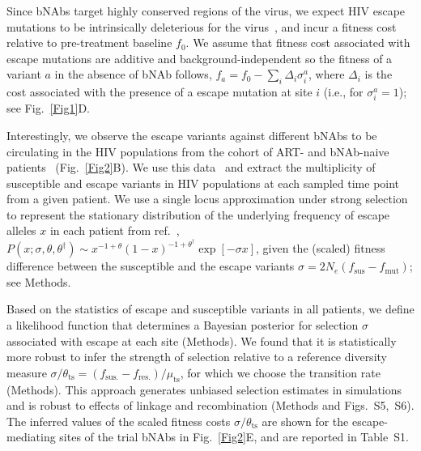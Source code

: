 \documentclass[aps,prx,noshowpacs,twocolumn,nofootinbib]{revtex4-2}
\begin{document}
  Since bNAbs target highly conserved regions of the virus, we expect HIV escape mutations to be intrinsically deleterious for the virus~\cite{Ferguson:2013kb,meijersPredictingVivoEscape2021}, and incur a fitness cost relative to pre-treatment baseline $f_0$. We assume that fitness cost associated with escape mutations are additive and background-independent so the fitness of a variant $a$ in the absence of bNAb follows, $f_a  =  f_0 - \sum_{i} \Delta_{i} \sigma_{i}^{a} $, where $ \Delta_{i}$ is the cost associated with the presence of a escape mutation at site $i$ (i.e., for $\sigma_{i}^{a}  =1$); see Fig.~\ref{Fig1}D. 

Interestingly, we observe the escape variants against different bNAbs to be circulating in the HIV populations from the cohort of ART- and bNAb-naive patients~\cite{Zanini:2015gg} (Fig.~\ref{Fig2}B). We use this data~\cite{Zanini:2015gg} and extract the multiplicity of susceptible and escape variants in HIV populations at each sampled time point  from a given patient. We use a single locus approximation under strong selection to represent the stationary distribution of the  underlying frequency of escape alleles $x$ in each patient from ref.~\cite{Zanini:2015gg}, 
	$P(x;\sigma, \theta,\theta^\dagger)\sim x^{-1+\theta} (1-x)^{-1+ \theta^\dagger} \exp[-\sigma x]$, 
	given the (scaled) fitness difference between the susceptible and the escape variants
	$\sigma= 2N_e (f_\text{sus}-f_\text{mut})$; see Methods.

Based on the statistics of escape and susceptible variants in all patients, we define a likelihood function that determines a Bayesian posterior for  selection $\sigma$ associated with escape at each site (Methods). We found that it is statistically more robust to infer the strength of selection relative to a reference diversity measure $\sigma/ \theta_\text{ts} = (f_\text{sus.}-f_\text{res.}) / \mu_\text{ts}$, for which we choose the transition rate (Methods). This approach generates unbiased selection estimates in simulations and is robust to effects of linkage and recombination (Methods and Figs.~S5,~S6). The inferred values of the scaled fitness costs $\sigma/ \theta_\text{ts}$ are shown for the   escape-mediating sites of the  trial bNAbs in Fig.~\ref{Fig2}E, and are reported in Table~S1. 
\end{document}
